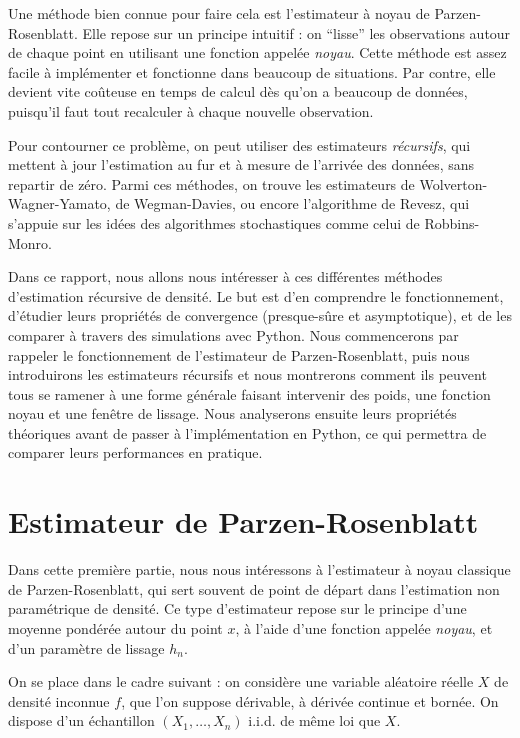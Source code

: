 \documentclass[12pt]{article}
\begin{document}
Une méthode bien connue pour faire cela est l’estimateur à noyau de Parzen-Rosenblatt. Elle repose sur un principe intuitif : on “lisse” les observations autour de chaque point en utilisant une fonction appelée \emph{noyau}. Cette méthode est assez facile à implémenter et fonctionne dans beaucoup de situations. Par contre, elle devient vite coûteuse en temps de calcul dès qu’on a beaucoup de données, puisqu’il faut tout recalculer à chaque nouvelle observation.

Pour contourner ce problème, on peut utiliser des estimateurs \emph{récursifs}, qui mettent à jour l’estimation au fur et à mesure de l’arrivée des données, sans repartir de zéro. Parmi ces méthodes, on trouve les estimateurs de Wolverton-Wagner-Yamato, de Wegman-Davies, ou encore l’algorithme de Revesz, qui s’appuie sur les idées des algorithmes stochastiques comme celui de Robbins-Monro.

Dans ce rapport, nous allons nous intéresser à ces différentes méthodes d'estimation récursive de densité. Le but est d’en comprendre le fonctionnement, d'étudier leurs propriétés de convergence (presque-sûre et asymptotique), et de les comparer à travers des simulations avec Python. Nous commencerons par rappeler le fonctionnement de l’estimateur de Parzen-Rosenblatt, puis nous introduirons les estimateurs récursifs et nous montrerons comment ils peuvent tous se ramener à une forme générale faisant intervenir des poids, une fonction noyau et une fenêtre de lissage. Nous analyserons ensuite leurs propriétés théoriques avant de passer à l’implémentation en Python, ce qui permettra de comparer leurs performances en pratique.

\clearpage


\section{Estimateur de Parzen-Rosenblatt}

Dans cette première partie, nous nous intéressons à l’estimateur à noyau classique de Parzen-Rosenblatt, qui sert souvent de point de départ dans l’estimation non paramétrique de densité. Ce type d’estimateur repose sur le principe d’une moyenne pondérée autour du point \( x \), à l’aide d’une fonction appelée \emph{noyau}, et d’un paramètre de lissage \( h_n \).

\vspace{1em}
On se place dans le cadre suivant : on considère une variable aléatoire réelle \( X \) de densité inconnue \( f \), que l’on suppose dérivable, à dérivée continue et bornée. On dispose d’un échantillon \( (X_1, \dots, X_n) \) i.i.d. de même loi que \( X \).
\end{document}
